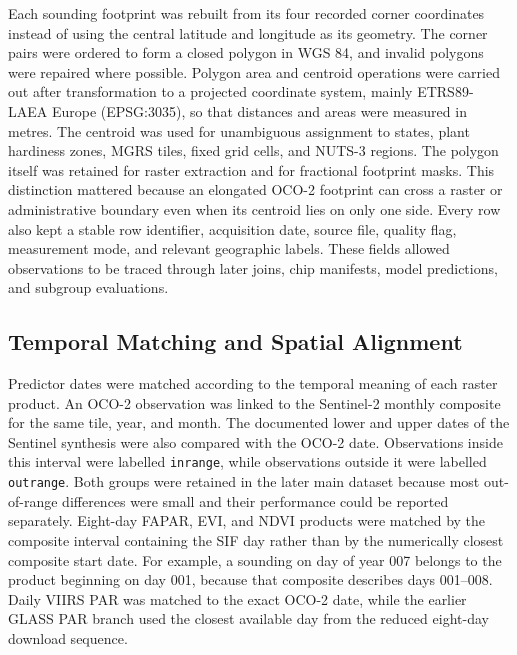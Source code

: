 Each sounding footprint was rebuilt from its four recorded corner coordinates instead of using the central latitude and longitude as its geometry. The corner pairs were ordered to form a closed polygon in WGS 84, and invalid polygons were repaired where possible. Polygon area and centroid operations were carried out after transformation to a projected coordinate system, mainly ETRS89-LAEA Europe (EPSG:3035), so that distances and areas were measured in metres. The centroid was used for unambiguous assignment to states, plant hardiness zones, MGRS tiles, fixed grid cells, and NUTS-3 regions. The polygon itself was retained for raster extraction and for fractional footprint masks. This distinction mattered because an elongated OCO-2 footprint can cross a raster or administrative boundary even when its centroid lies on only one side. Every row also kept a stable row identifier, acquisition date, source file, quality flag, measurement mode, and relevant geographic labels. These fields allowed observations to be traced through later joins, chip manifests, model predictions, and subgroup evaluations.

\subsection{Temporal Matching and Spatial Alignment}

Predictor dates were matched according to the temporal meaning of each raster product. An OCO-2 observation was linked to the Sentinel-2 monthly composite for the same tile, year, and month. The documented lower and upper dates of the Sentinel synthesis were also compared with the OCO-2 date. Observations inside this interval were labelled \texttt{inrange}, while observations outside it were labelled \texttt{outrange}. Both groups were retained in the later main dataset because most out-of-range differences were small and their performance could be reported separately. Eight-day FAPAR, EVI, and NDVI products were matched by the composite interval containing the SIF day rather than by the numerically closest composite start date. For example, a sounding on day of year 007 belongs to the product beginning on day 001, because that composite describes days 001--008. Daily VIIRS PAR was matched to the exact OCO-2 date, while the earlier GLASS PAR branch used the closest available day from the reduced eight-day download sequence.

